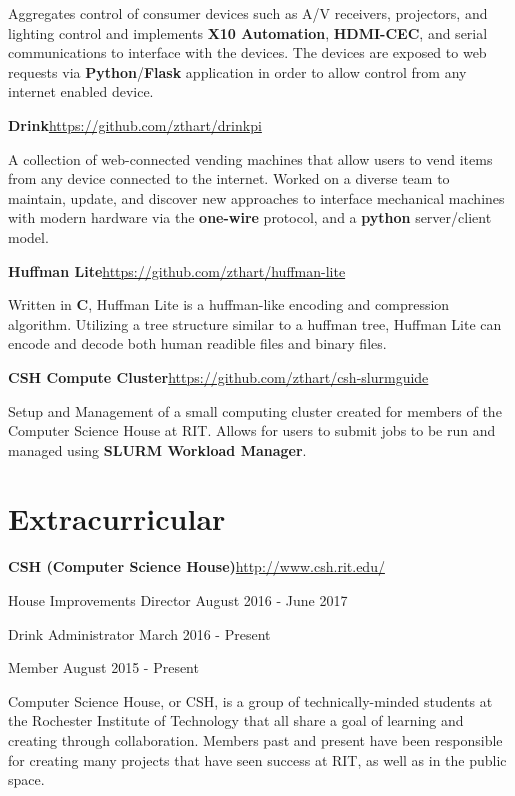 \documentclass[margin,line]{resume}
\newcommand{\rurl}[1]{\hfill {\footnotesize \url{#1}}}
\begin{document}
\begin{resume}
\begin{asparablank}
		\small Aggregates control of consumer devices such as A/V receivers, projectors, and lighting control and implements \textbf{X10 Automation}, \textbf{HDMI-CEC}, and serial communications to interface with the devices. The devices are exposed to web requests via \textbf{Python}/\textbf{Flask} application in order to allow control from any internet enabled device.
		\normalsize
        \\
        \item {\bf Drink}\rurl{https://github.com/zthart/drinkpi}
        
        \small A collection of web-connected vending machines that allow users to vend items from any device connected to the internet. Worked on a diverse team to maintain, update, and discover new approaches to interface mechanical machines with modern hardware via the \textbf{one-wire} protocol, and a \textbf{python} server/client model.
        \normalsize
		\\
		\item {\bf Huffman Lite}\rurl{https://github.com/zthart/huffman-lite}
		
		\small Written in \textbf{C}, Huffman Lite is a huffman-like encoding and compression algorithm. Utilizing a tree structure similar to a huffman tree, Huffman Lite can encode and decode both human readible files and binary files.
		\normalsize
		\\
		\item {\bf CSH Compute Cluster}\rurl{https://github.com/zthart/csh-slurmguide}

		\small Setup and Management of a small computing cluster created for members of the Computer Science House at RIT. Allows for users to submit jobs to be run and managed using \textbf{SLURM Workload Manager}.
	\end{asparablank}
    
\section{\mysidestyle Extracurricular}
	\begin{asparablank}
		\item {\bf CSH ({\small Computer Science House})}\rurl{http://www.csh.rit.edu/}
		\small	\item House Improvements Director \hfill August 2016 - June 2017
        \small  \item Drink Administrator \hfill March 2016 - Present
        \small  \item Member \hfill August 2015 - Present
        \linebreak
        
        \small Computer Science House, or CSH, is a group of technically-minded students at the Rochester Institute of Technology that all share a goal of learning and creating through collaboration. Members past and present have been responsible for creating many projects that have seen success at RIT, as well as in the public space.
	\end{asparablank}
    

\end{resume}
\end{document}
